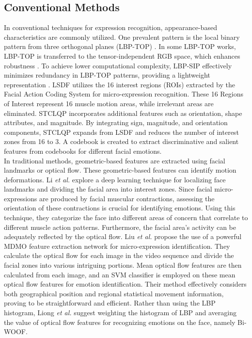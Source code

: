 \documentclass[review,12pt, 3p]{elsarticle}
\begin{document}
\subsection{Conventional Methods}
In conventional techniques for expression recognition, appearance-based characteristics are commonly utilized. One prevalent pattern is the local binary pattern from three orthogonal planes (LBP-TOP) \cite{ref-20}. In some LBP-TOP works, LBP-TOP is transferred to the tensor-independent RGB space, which enhances robustness \cite{ref-21}. To achieve lower computational complexity, LBP-SIP effectively minimizes redundancy in LBP-TOP patterns, providing a lightweight representation \cite{ref-23}. LSDF \cite{ref-19} utilizes the 16 interest regions (ROIs) extracted by the Facial Action Coding System for micro-expression recognition. These 16 Regions of Interest represent 16 muscle motion areas, while irrelevant areas are eliminated. STCLQP \cite{ref-28} incorporates additional features such as orientation, shape attributes, and magnitude. By integrating sign, magnitude, and orientation components, STCLQP expands from LSDF and reduces the number of interest zones from 16 to 3. A codebook is created to extract discriminative and salient features from codebooks for different facial emotions.\\
In traditional methods, geometric-based features are extracted using facial landmarks or optical flow. These geometric-based features can identify motion deformations. Li \textit{et al.} \cite{ref-29} explore a deep learning technique for localizing face landmarks and dividing the facial area into interest zones. Since facial micro-expressions are produced by facial muscular contractions, assessing the orientation of these contractions is crucial for identifying emotions. Using this technique, they categorize the face into different areas of concern that correlate to different muscle action patterns. Furthermore, the facial area's activity can be adequately reflected by the optical flow. Liu \textit{et al.} \cite{ref-26} propose the use of a powerful MDMO feature extraction network for micro-expression identification. They calculate the optical flow for each image in the video sequence and divide the facial zones into various intriguing portions. Mean optical flow features are then calculated from each image, and an SVM classifier is employed on these mean optical flow features for emotion identification. Their method effectively considers both geographical position and regional statistical movement information, proving to be straightforward and efficient. Rather than using the LBP histogram, Liong \textit{et al.} \cite{ref-24} suggest weighting the histogram of LBP and averaging the value of optical flow features for recognizing emotions on the face, namely Bi-WOOF.\\
\end{document}
